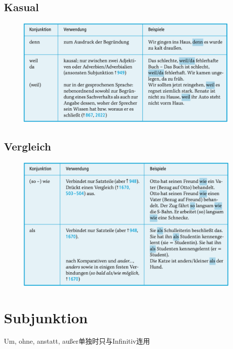 \documentclass[UTF8]{report}
\begin{document}
\subsection{Kasual}
\begin{figure}[H]
    \centering
    \includegraphics[scale=0.55]{kc.png}
\end{figure}

\subsection{Vergleich}
\begin{figure}[H]
    \centering
    \includegraphics[scale=0.55]{ver.png}
\end{figure}



\section{Subjunktion}
Um, ohne, anstatt, außer单独时只与Infinitiv连用
\end{document}
